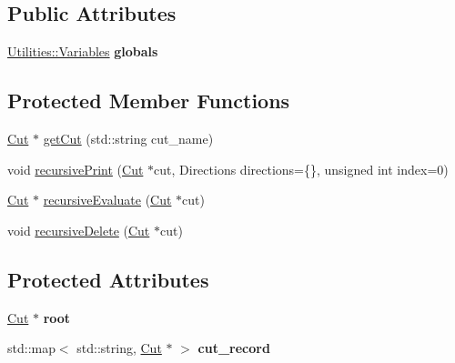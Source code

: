 \subsection*{Public Attributes}
\begin{DoxyCompactItemize}
\item 
\hyperlink{classUtilities_1_1Variables}{Utilities\+::\+Variables} {\bfseries globals}\hypertarget{classCutflow_a71390324488ac6ed4a72c41f4a2c1c10}{}\label{classCutflow_a71390324488ac6ed4a72c41f4a2c1c10}

\end{DoxyCompactItemize}
\subsection*{Protected Member Functions}
\begin{DoxyCompactItemize}
\item 
\hyperlink{classCut}{Cut} $\ast$ \hyperlink{classCutflow_a20193ee89ee39b0fc58ab4f27e2779db}{get\+Cut} (std\+::string cut\+\_\+name)
\item 
void \hyperlink{classCutflow_a4acc0465c3fd23989e60db56583b1a3e}{recursive\+Print} (\hyperlink{classCut}{Cut} $\ast$cut, Directions directions=\{\}, unsigned int index=0)
\item 
\hyperlink{classCut}{Cut} $\ast$ \hyperlink{classCutflow_ae4fc37122bc9437fe3cdaa9861c2bcec}{recursive\+Evaluate} (\hyperlink{classCut}{Cut} $\ast$cut)
\item 
void \hyperlink{classCutflow_adc7029b27ff8d742d10c75d6f6342dac}{recursive\+Delete} (\hyperlink{classCut}{Cut} $\ast$cut)
\end{DoxyCompactItemize}
\subsection*{Protected Attributes}
\begin{DoxyCompactItemize}
\item 
\hyperlink{classCut}{Cut} $\ast$ {\bfseries root}\hypertarget{classCutflow_a96f2343bfae77c94f2e87b5f3a128d6d}{}\label{classCutflow_a96f2343bfae77c94f2e87b5f3a128d6d}

\item 
std\+::map$<$ std\+::string, \hyperlink{classCut}{Cut} $\ast$ $>$ {\bfseries cut\+\_\+record}\hypertarget{classCutflow_a76f5cbd82750844d379384c7b1243cca}{}\label{classCutflow_a76f5cbd82750844d379384c7b1243cca}

\end{DoxyCompactItemize}


